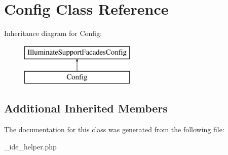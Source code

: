 \hypertarget{class_config}{}\section{Config Class Reference}
\label{class_config}
Inheritance diagram for Config\+:\begin{figure}[H]
\begin{center}
\leavevmode
\includegraphics[height=2.000000cm]{class_config}
\end{center}
\end{figure}
\subsection*{Additional Inherited Members}


The documentation for this class was generated from the following file\+:\begin{DoxyCompactItemize}
\item 
\+\_\+ide\+\_\+helper.\+php\end{DoxyCompactItemize}
